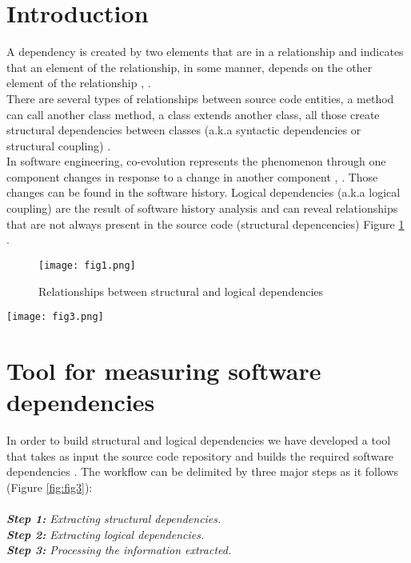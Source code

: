 \documentclass[conference,compsoc]{IEEEtran}
\begin{document}
\section{Introduction}
A dependency is created by two elements that are in a relationship and indicates that an element of the relationship, in some manner, depends on the other element of the relationship \cite{ct2}, \cite{ct3}. \\There are several types of relationships between source code entities, a method can call another class method, a class extends another class, all those create structural dependencies between classes (a.k.a syntactic dependencies or structural coupling) \cite{ct4}.\\In software engineering, co-evolution represents the phenomenon through one component changes in response to a change in another component \cite{ct6}, \cite{ct5}. Those changes can be found in the software history. Logical dependencies (a.k.a logical coupling) are the result of software history analysis and can reveal relationships that are not always present in the source code (structural depencencies)  Figure \ref{fig:fig1} .
\begin{figure}[h]
\texttt{[image: fig1.png]}
\caption{Relationships between structural and logical dependencies }
\label{fig:fig1}
\centering
\end{figure}
\begin{figure*}[h]
\centering
\texttt{[image: fig3.png]}
\caption{Processing phases}
\label{fig:fig3}
\end{figure*}
\section{Tool for measuring software dependencies}
In order to build structural and logical dependencies we have developed a tool that takes as input the source code repository and builds the required software dependencies . The workflow can be delimited by three major steps as it follows (Figure \ref{fig:fig3}):\\ \\
\textit{\textbf{Step 1:} Extracting structural dependencies.}\\
\textit{\textbf{Step 2:} Extracting logical dependencies.}\\
\textit{\textbf{Step 3:} Processing the information extracted.}
\end{document}
